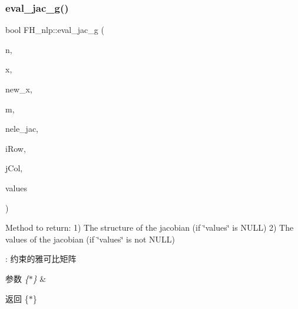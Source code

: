 \subsubsection{\texorpdfstring{eval\+\_\+jac\+\_\+g()}{eval\_jac\_g()}}
{\footnotesize\ttfamily bool F\+H\+\_\+nlp\+::eval\+\_\+jac\+\_\+g (\begin{DoxyParamCaption}\item[{Index}]{n,  }\item[{const Number $\ast$}]{x,  }\item[{bool}]{new\+\_\+x,  }\item[{Index}]{m,  }\item[{Index}]{nele\+\_\+jac,  }\item[{Index $\ast$}]{i\+Row,  }\item[{Index $\ast$}]{j\+Col,  }\item[{Number $\ast$}]{values }\end{DoxyParamCaption})\hspace{0.3cm}{\ttfamily [virtual]}}

Method to return\+: 1) The structure of the jacobian (if \char`\"{}values\char`\"{} is N\+U\+LL) 2) The values of the jacobian (if \char`\"{}values\char`\"{} is not N\+U\+LL)

\+: 约束的雅可比矩阵 
\begin{DoxyParams}{参数}
{\em \{$\ast$\}} & \\
\hline
\end{DoxyParams}
\begin{DoxyReturn}{返回}
\{$\ast$\} 
\end{DoxyReturn}
\mbox{\label{classquadruped_1_1FH__nlp_aae99a7bb4a2e1eb7fee96440583fae95}} 
